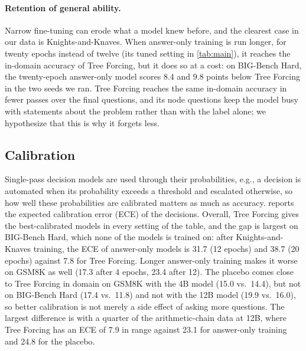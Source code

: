 \documentclass{article}
\newcommand{\tf}{Tree Forcing}
\begin{document}
\paragraph{Retention of general ability.} Narrow fine-tuning can erode what a model knew before, and the clearest
case in our data is Knights-and-Knaves. When answer-only training is run longer, for twenty epochs instead of twelve
(its tuned setting in \cref{tab:main}), it reaches the in-domain accuracy of \tf{}, but it does so at a cost: on BIG-Bench Hard, the twenty-epoch answer-only
model scores 8.4 and 9.8 points below \tf{} in the two seeds we ran. \tf{} reaches the same in-domain accuracy in
fewer passes over the final questions, and its node questions keep the model busy with statements about the problem
rather than with the label alone; we hypothesize that this is why it forgets less.

\subsection{Calibration}
\label{sec:calibration}

Single-pass decision models are used through their probabilities, e.g., a decision is automated when its probability
exceeds a threshold and escalated otherwise, so how well these probabilities are calibrated matters as much as
accuracy.  reports the expected calibration error (ECE) of the decisions. Overall, \tf{} gives
the best-calibrated models in every setting of the table, and the gap is largest on BIG-Bench Hard, which none of the
models is trained on: after Knights-and-Knaves training, the ECE of answer-only models is 31.7 (12 epochs) and 38.7
(20 epochs) against 7.8 for \tf{}. Longer answer-only training makes it worse on GSM8K as well (17.3 after 4 epochs,
23.4 after 12). The placebo comes close to \tf{} in domain on GSM8K with the 4B model (15.0 vs.\ 14.4), but not on
BIG-Bench Hard (17.4 vs.\ 11.8) and not with the 12B model (19.9 vs.\ 16.0), so better calibration is not merely a
side effect of asking more questions. The largest difference is with a quarter of the arithmetic-chain data at 12B,
where \tf{} has an ECE of 7.9 in range against 23.1 for answer-only training and 24.8 for the placebo.
\end{document}
